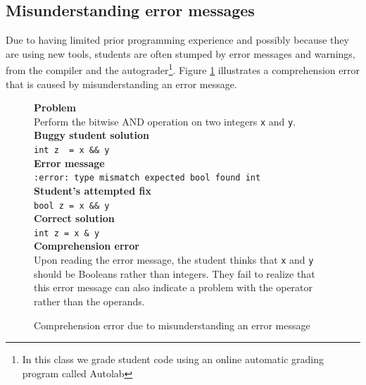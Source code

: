 \documentclass{sig-alternate}
\begin{document}
\subsection{Misunderstanding error messages}

Due to having limited prior programming experience and possibly
because they are using new tools, students are often stumped by error
messages and warnings, from the compiler and the
autograder\footnote{In this class we grade student code using an
online automatic grading program called Autolab}. Figure
\ref{fig:comp3} illustrates a comprehension error that is caused by
misunderstanding an error message.


\begin{figure}
\begin{framed}
\setlength{\parindent}{0cm}
\textbf{Problem} \\
Perform the bitwise AND operation on two integers \texttt{x} and \texttt{y}.\\

\textbf{Buggy student solution} \\
\verb|int z  = x && y|\\

\textbf{Error message}\\
\texttt{:error: type mismatch expected bool found int}\\

\textbf{Student's attempted fix}\\
\verb|bool z = x && y|\\

\textbf{Correct solution}\\
\verb|int z = x & y|\\

\textbf{Comprehension error}\\

Upon reading the error message, the student thinks that \texttt{x} and
\texttt{y} should be Booleans rather than integers. They fail to
realize that this error message can also indicate a problem with the
operator rather than the operands.

\end{framed}
\vspace{-0.1in}
\caption{Comprehension error due to misunderstanding an error message}
\label{fig:comp3}
\end{figure}
\end{document}
